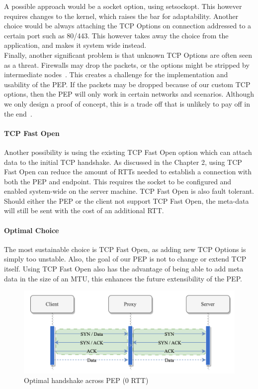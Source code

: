 \documentclass[a4paper,english, 12pt]{report}
\begin{document}
A possible approach would be a socket option, using setsockopt. This however requires changes to the kernel, which raises the bar for adaptability. Another choice would be always attaching the TCP Options on connection addressed to a certain port such as 80/443. This however takes away the choice from the application, and makes it system wide instead.\\

Finally, another significant problem is that unknown TCP Options are often seen as a threat. Firewalls may drop the packets, or the options might be stripped by intermediate nodes~\cite{middlebox_interactions}. This creates a challenge for the implementation and usability of the PEP. If the packets may be dropped because of our custom TCP options, then the PEP will only work in certain networks and scenarios. Although we only design a proof of concept, this is a trade off that is unlikely to pay off in the end~\cite{tcp_extendable}.

\paragraph{TCP Fast Open}
Another possibility is using the existing TCP Fast Open option which can attach data to the initial TCP handshake. As discussed in the Chapter 2, using TCP Fast Open can reduce the amount of RTTs needed to establish a connection with both the PEP and endpoint. This requires the socket to be configured and enabled system-wide on the server machine. TCP Fast Open is also fault tolerant. Should either the PEP or the client not support TCP Fast Open, the meta-data will still be sent with the cost of an additional RTT. 

\paragraph{Optimal Choice}
The most sustainable choice is TCP Fast Open, as adding new TCP Options is simply too unstable. Also, the goal of our PEP is not to change or extend TCP itself. Using TCP Fast Open also has the advantage of being able to add meta data in the size of an MTU, this enhances the future extensibility of the PEP.\\

\begin{figure} %
	\centering
	\includegraphics[scale=0.75]{../diagrams/drawio/tcphandshake_optimal.png}
  	\caption{Optimal handshake across PEP (0 RTT)}
  	\label{fig:tcphandshake_optimal}
\end{figure}
\end{document}
